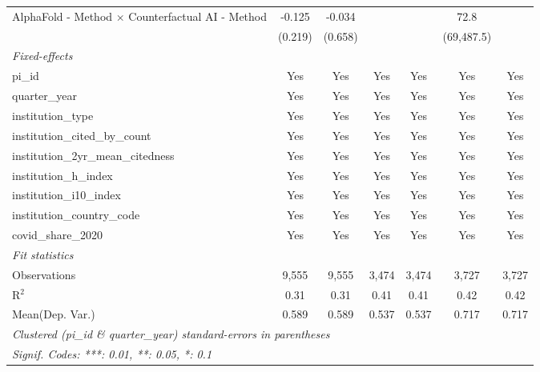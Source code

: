 \begin{tabular}{lcccccc}
   AlphaFold - Method $\times$ Counterfactual AI - Method      & -0.125       & -0.034        &               &                & 72.8           &   \\   
                                                               & (0.219)      & (0.658)       &               &                & (69,487.5)     &   \\   
   \midrule
   \emph{Fixed-effects}\\
   pi\_id                                                      & Yes          & Yes           & Yes           & Yes            & Yes            & Yes\\  
   quarter\_year                                               & Yes          & Yes           & Yes           & Yes            & Yes            & Yes\\  
   institution\_type                                           & Yes          & Yes           & Yes           & Yes            & Yes            & Yes\\  
   institution\_cited\_by\_count                               & Yes          & Yes           & Yes           & Yes            & Yes            & Yes\\  
   institution\_2yr\_mean\_citedness                           & Yes          & Yes           & Yes           & Yes            & Yes            & Yes\\  
   institution\_h\_index                                       & Yes          & Yes           & Yes           & Yes            & Yes            & Yes\\  
   institution\_i10\_index                                     & Yes          & Yes           & Yes           & Yes            & Yes            & Yes\\  
   institution\_country\_code                                  & Yes          & Yes           & Yes           & Yes            & Yes            & Yes\\  
   covid\_share\_2020                                          & Yes          & Yes           & Yes           & Yes            & Yes            & Yes\\  
   \midrule
   \emph{Fit statistics}\\
   Observations                                                & 9,555        & 9,555         & 3,474         & 3,474          & 3,727          & 3,727\\  
   R$^2$                                                       & 0.31         & 0.31          & 0.41          & 0.41           & 0.42           & 0.42\\  
Mean(Dep. Var.) & 0.589 & 0.589 & 0.537 & 0.537 & 0.717 & 0.717 \\
   \midrule \midrule
   \multicolumn{7}{l}{\emph{Clustered (pi\_id \& quarter\_year) standard-errors in parentheses}}\\
   \multicolumn{7}{l}{\emph{Signif. Codes: ***: 0.01, **: 0.05, *: 0.1}}\\
\end{tabular}
\par\endgroup

